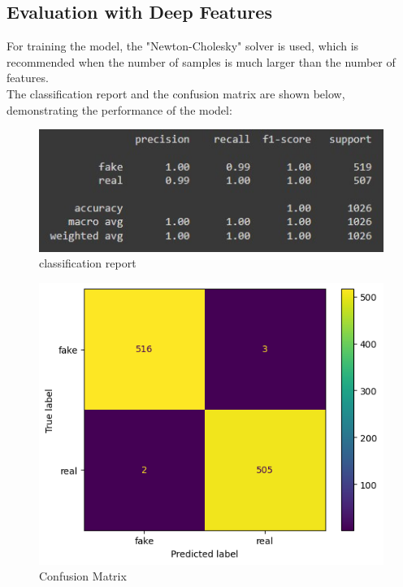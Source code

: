 \documentclass{template}
\begin{document}
\subsection{Evaluation with Deep Features}
For training the model, the "Newton-Cholesky" solver is used, which is recommended when the number of samples is much larger than the number of features.
\\
The classification report and the confusion matrix are shown below, demonstrating the performance of the model:
\begin{figure}
\includegraphics[scale=0.9]{LR1.jpg}
\caption{classification report}
\label{fig:logo}
\end{figure}
\begin{figure}
\includegraphics[scale=0.9]{LR2.png}
\caption{Confusion Matrix}
\label{fig:logo}
\end{figure}
\end{document}
